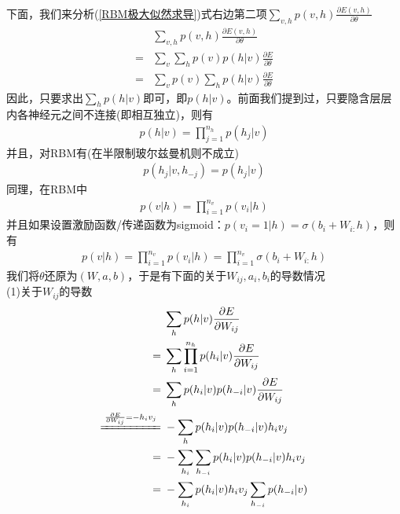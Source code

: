 {\begin{align}
            \end{align}
            \par
            下面，我们来分析(\ref{RBM极大似然求导})式右边第二项$\sum_{v,h}p(v,h)\frac{\partial E(v,h)}{\partial \theta}$
            \begin{align*}
            & \sum_{v,h}p(v,h)\frac{\partial E(v,h)}{\partial \theta} \\
            ={}& \sum_v\sum_hp(v)p(h|v)\frac{\partial E}{\partial \theta}\\
            ={}& \sum_vp(v)\sum_hp(h|v)\frac{\partial E}{\partial \theta}
            \end{align*}
            因此，只要求出$\sum_hp(h|v)$即可，即$p(h|v)$。前面我们提到过，只要隐含层层内各神经元之间不连接(即相互独立)，则有
            \begin{align*}
            p(h|v) = \prod_{j=1}^{n_h}p(h_j|v)
            \end{align*}
            并且，对RBM有(在半限制玻尔兹曼机则不成立)
            \begin{align*}
            p(h_j|v ,h_{-j}) = p(h_j|v)
            \end{align*}
            同理，在RBM中
            \begin{align*}
            p(v|h) = \prod_{i=1}^{n_v}p(v_i|h)
            \end{align*}
            并且如果设置激励函数/传递函数为sigmoid：$p(v_i=1|h) = \sigma(b_i +W_{i:}h)$，则有
            \begin{align*}
            p(v|h) = \prod_{i=1}^{n_v}p(v_i|h)=  \prod_{i=1}^{n_v}\sigma(b_i +W_{i:}h)
            \end{align*}
            我们将$\theta$还原为$(W,a,b)$，于是有下面的关于$W_{ij},a_i,b_i$的导数情况\\
            (1)关于$W_{ij}$的导数
            \begin{align*}
            &\sum_hp(h|v) \frac{\partial E}{\partial W_{ij}}\\
            ={}& \sum_h\prod_{i=1}^{n_h}p(h_i|v)\frac{\partial E}{\partial W_{ij}}\\
            ={}& \sum_h p(h_i|v)p(h_{-i}|v)\frac{\partial E}{\partial W_{ij}}\\
            \xlongequal{\frac{\partial E}{\partial W_{ij}} = -h_iv_j} {}&-\sum_hp(h_i|v)p(h_{-i}|v)h_iv_j\\
            ={}&-\sum_{h_i}\sum_{h_{-i}}p(h_i|v)p(h_{-i}|v)h_iv_j\\
            ={}&-\sum_{h_i}p(h_i|v)h_iv_j\sum_{h_{-i}} p(h_{-i}|v)\\

\end{align*}}
